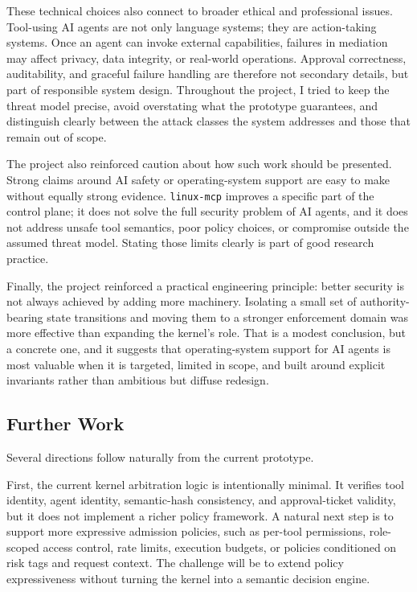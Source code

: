 These technical choices also connect to broader ethical and professional issues.
Tool-using AI agents are not only language systems; they are action-taking systems. 
Once an agent can invoke external capabilities, failures in mediation may affect privacy, data integrity, or real-world operations. 
Approval correctness, auditability, and graceful failure handling are therefore not secondary details, but part of responsible system design. 
Throughout the project, I tried to keep the threat model precise, avoid overstating what the prototype guarantees, and distinguish clearly between the attack classes the system addresses and those that remain out of scope.

The project also reinforced caution about how such work should be presented.
Strong claims around AI safety or operating-system support are easy to make without equally strong evidence. \texttt{linux-mcp} improves a specific part of the control plane; it does not solve the full security problem of AI agents, and it does not address unsafe tool semantics, poor policy choices, or compromise outside the assumed threat model. Stating those limits clearly is part of good research practice.

Finally, the project reinforced a practical engineering principle: better security is not always achieved by adding more machinery.
Isolating a small set of authority-bearing state transitions and moving them to a stronger enforcement domain was more effective than expanding the kernel's role.
That is a modest conclusion, but a concrete one, and it suggests that operating-system support for AI agents is most valuable when it is targeted, limited in scope, and built around explicit invariants rather than ambitious but diffuse redesign.

\subsection{Further Work}

Several directions follow naturally from the current prototype.

First, the current kernel arbitration logic is intentionally minimal. 
It verifies tool identity, agent identity, semantic-hash consistency, and approval-ticket validity, but it does not implement a richer policy framework.
A natural next step is to support more expressive admission policies, such as per-tool permissions, role-scoped access control, rate limits, execution budgets, or policies conditioned on risk tags and request context. 
The challenge will be to extend policy expressiveness without turning the kernel into a semantic decision engine.

